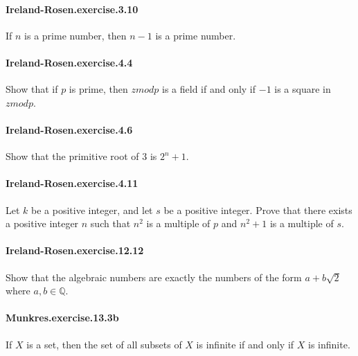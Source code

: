 \documentclass{article}
\begin{document}
\paragraph{Ireland-Rosen.exercise.3.10} If $n$ is a prime number, then $n-1$ is a prime number.

\paragraph{Ireland-Rosen.exercise.4.4} Show that if $p$ is prime, then $zmod p$ is a field if and only if $-1$ is a square in $zmod p$.

\paragraph{Ireland-Rosen.exercise.4.6} Show that the primitive root of $3$ is $2^n + 1$.

\paragraph{Ireland-Rosen.exercise.4.11} Let $k$ be a positive integer, and let $s$ be a positive integer. Prove that there exists a positive integer $n$ such that $n^2$ is a multiple of $p$ and $n^2+1$ is a multiple of $s$.


\paragraph{Ireland-Rosen.exercise.12.12} Show that the algebraic numbers are exactly the numbers of the form $a + b \sqrt{2}$ where $a, b \in \mathbb{Q}$.

\paragraph{Munkres.exercise.13.3b} If $X$ is a set, then the set of all subsets of $X$ is infinite if and only if $X$ is infinite.

\end{document}

